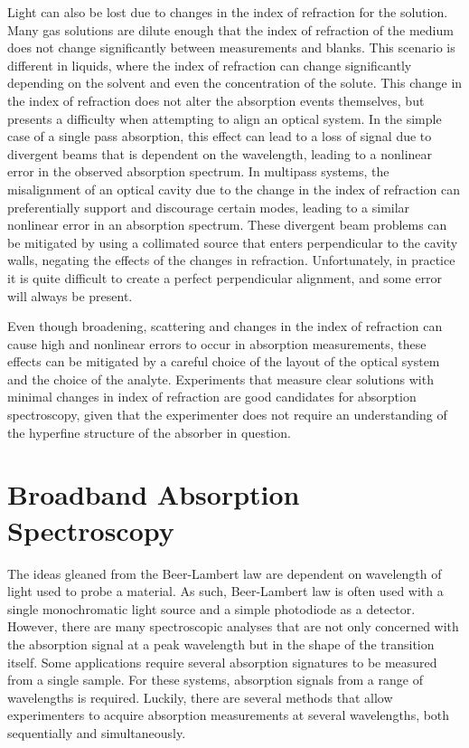 
Light can also be lost due to changes in the index of refraction for the
solution. Many gas solutions are dilute enough that the index of refraction of
the medium does not change significantly between measurements and blanks. This
scenario is different in liquids, where the index of refraction can change
significantly depending on the solvent and even the concentration of the
solute. This change in the index of refraction does not alter the absorption
events themselves, but presents a difficulty when attempting to align an
optical system. In the simple case of a single pass absorption, this effect can
lead to a loss of signal due to divergent beams that is dependent on the
wavelength, leading to a nonlinear error in the observed absorption spectrum.
In multipass systems, the misalignment of an optical cavity due to the change
in the index of refraction can preferentially support and discourage certain
modes, leading to a similar nonlinear error in an absorption spectrum. These
divergent beam problems can be mitigated by using a collimated source that
enters perpendicular to the cavity walls, negating the effects of the changes
in refraction. Unfortunately, in practice it is quite difficult to create a
perfect perpendicular alignment, and some error will always be present.

Even though broadening, scattering and changes in the index of refraction can
cause high and nonlinear errors to occur in absorption measurements, these
effects can be mitigated by a careful choice of the layout of the optical
system and the choice of the analyte. Experiments that measure clear solutions
with minimal changes in index of refraction are good candidates for absorption
spectroscopy, given that the experimenter does not require an understanding of
the hyperfine structure of the absorber in question.



\section{Broadband Absorption Spectroscopy}\label{sec:broad_abs}

The ideas gleaned from the Beer-Lambert law are dependent on wavelength of
light used to probe a material. As such, Beer-Lambert law is often used with a
single monochromatic light source and a simple photodiode as a detector.
However, there are many spectroscopic analyses that are not only concerned with
the absorption signal at a peak wavelength but in the shape of the transition
itself. Some applications require several absorption signatures to be measured
from a single sample. For these systems, absorption signals from a range of
wavelengths is required. Luckily, there are several methods that allow
experimenters to acquire absorption measurements at several wavelengths, both
sequentially and simultaneously.



